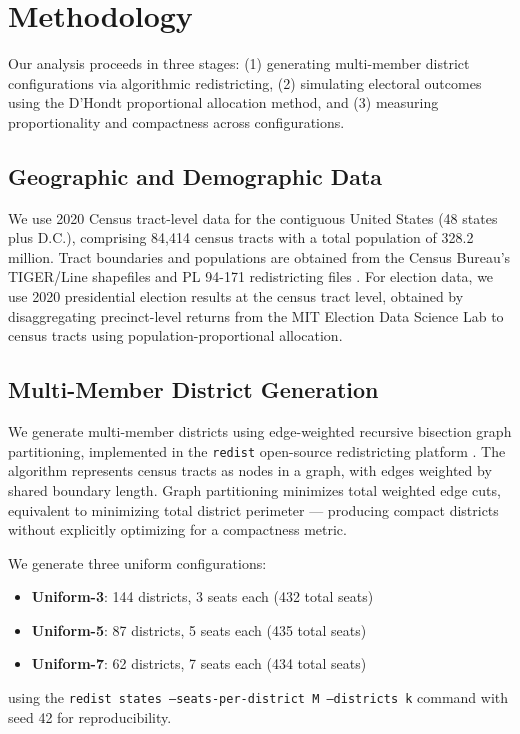 
\section{Methodology}

Our analysis proceeds in three stages: (1) generating multi-member district configurations via algorithmic redistricting, (2) simulating electoral outcomes using the D'Hondt proportional allocation method, and (3) measuring proportionality and compactness across configurations.

\subsection{Geographic and Demographic Data}

We use 2020 Census tract-level data for the contiguous United States (48 states plus D.C.), comprising 84,414 census tracts with a total population of 328.2 million. Tract boundaries and populations are obtained from the Census Bureau's TIGER/Line shapefiles and PL 94-171 redistricting files \citep{census2020pl941}. For election data, we use 2020 presidential election results at the census tract level, obtained by disaggregating precinct-level returns from the MIT Election Data Science Lab \citep{MEDSL2020} to census tracts using population-proportional allocation.

\subsection{Multi-Member District Generation}

We generate multi-member districts using edge-weighted recursive bisection graph partitioning, implemented in the \texttt{redist} open-source redistricting platform \citep{redistcli2026}. The algorithm represents census tracts as nodes in a graph, with edges weighted by shared boundary length. Graph partitioning minimizes total weighted edge cuts, equivalent to minimizing total district perimeter --- producing compact districts without explicitly optimizing for a compactness metric.

We generate three uniform configurations:
\begin{itemize}
    \item \textbf{Uniform-3}: 144 districts, 3 seats each (432 total seats)
    \item \textbf{Uniform-5}: 87 districts, 5 seats each (435 total seats)
    \item \textbf{Uniform-7}: 62 districts, 7 seats each (434 total seats)
\end{itemize}
using the \texttt{redist states --seats-per-district M --districts k} command with seed 42 for reproducibility.


